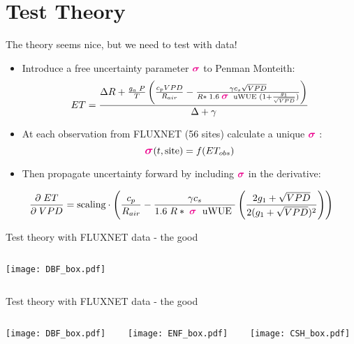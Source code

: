 \documentclass[aspectratio=169]{beamer}
\begin{document}
\section{Test Theory}
\begin{frame}{The theory seems nice, but we need to test with data!}
  \begin{itemize}
  \item Introduce a free uncertainty parameter \Large $\textcolor{magenta}{\boldsymbol{\sigma}}$ \normalsize to Penman Monteith:
    \[ET = \frac{\Delta R + \frac{g_a\; P}{T} \left( \frac{ c_p VPD}{R_{air}} -  \frac{\gamma c_s \sqrt{VPD} }{ R* \; 1.6\; \textcolor{magenta}{\boldsymbol{\mathlarger{\sigma}}} \; \text{ uWUE } (1 + \frac{g_1}{\sqrt{VPD}})} \right) }{ \Delta + \gamma}\]
  \item At each observation from FLUXNET (56 sites) calculate a unique \Large $\textcolor{magenta}{\boldsymbol{\sigma}}$ \normalsize:
    \[\textcolor{magenta}{\boldsymbol{\mathlarger{\sigma}}}(t, \text{site}) = f(ET_{obs})\]

    \item Then propagate uncertainty forward by including \Large $\textcolor{magenta}{\boldsymbol{\sigma}}$ \normalsize in the derivative:
    \end{itemize}
      \[\frac{\partial \;  ET}{\partial \; VPD} = \text{scaling} \cdot \left(\frac{ c_p}{R_{air}} -  \frac{\gamma c_s }{1.6 \; R*\; \textcolor{magenta}{\boldsymbol{\mathlarger{\sigma}}} \; \text{ uWUE }} \left( \frac{2 g_1 + \sqrt{VPD}}{2 (g_1 + \sqrt{VPD})^2}\right) \right)\]
\end{frame}
  
\begin{frame}{Test theory with FLUXNET data - the good}
  \begin{columns}
    \begin{column}{0.33\textwidth}
      \texttt{[image: DBF\_box.pdf]}
    \end{column}
    \begin{column}{0.33\textwidth}
    \end{column}
    \begin{column}{0.33\textwidth}
    \end{column}
  \end{columns}
\end{frame}

\begin{frame}{Test theory with FLUXNET data - the good}
  \begin{columns}
    \begin{column}{0.33\textwidth}
      \texttt{[image: DBF\_box.pdf]}
    \end{column}
    \begin{column}{0.33\textwidth}
      \texttt{[image: ENF\_box.pdf]}
    \end{column}
    \begin{column}{0.33\textwidth}
      \texttt{[image: CSH\_box.pdf]}
    \end{column}
  \end{columns}
\end{frame}
\end{document}
